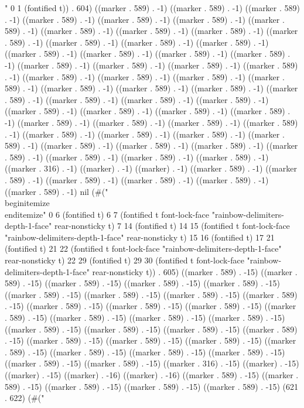 " 0 1 (fontified t)) . 604) ((marker . 589) . -1) ((marker . 589) . -1) ((marker . 589) . -1) ((marker . 589) . -1) ((marker . 589) . -1) ((marker . 589) . -1) ((marker . 589) . -1) ((marker . 589) . -1) ((marker . 589) . -1) ((marker . 589) . -1) ((marker . 589) . -1) ((marker . 589) . -1) ((marker . 589) . -1) ((marker . 589) . -1) ((marker . 589) . -1) ((marker . 589) . -1) ((marker . 589) . -1) ((marker . 589) . -1) ((marker . 589) . -1) ((marker . 589) . -1) ((marker . 589) . -1) ((marker . 589) . -1) ((marker . 589) . -1) ((marker . 589) . -1) ((marker . 589) . -1) ((marker . 589) . -1) ((marker . 589) . -1) ((marker . 589) . -1) ((marker . 589) . -1) ((marker . 589) . -1) ((marker . 589) . -1) ((marker . 589) . -1) ((marker . 589) . -1) ((marker . 589) . -1) ((marker . 589) . -1) ((marker . 589) . -1) ((marker . 589) . -1) ((marker . 589) . -1) ((marker . 589) . -1) ((marker . 589) . -1) ((marker . 589) . -1) ((marker . 589) . -1) ((marker . 589) . -1) ((marker . 589) . -1) ((marker . 589) . -1) ((marker . 589) . -1) ((marker . 589) . -1) ((marker . 589) . -1) ((marker . 589) . -1) ((marker . 589) . -1) ((marker . 589) . -1) ((marker . 589) . -1) ((marker . 316) . -1) ((marker) . -1) ((marker) . -1) ((marker . 589) . -1) ((marker . 589) . -1) ((marker . 589) . -1) ((marker . 589) . -1) ((marker . 589) . -1) ((marker . 589) . -1) nil (#("\\begin{itemize}
 \\end{itemize}" 0 6 (fontified t) 6 7 (fontified t font-lock-face "rainbow-delimiters-depth-1-face" rear-nonsticky t) 7 14 (fontified t) 14 15 (fontified t font-lock-face "rainbow-delimiters-depth-1-face" rear-nonsticky t) 15 16 (fontified t) 17 21 (fontified t) 21 22 (fontified t font-lock-face "rainbow-delimiters-depth-1-face" rear-nonsticky t) 22 29 (fontified t) 29 30 (fontified t font-lock-face "rainbow-delimiters-depth-1-face" rear-nonsticky t)) . 605) ((marker . 589) . -15) ((marker . 589) . -15) ((marker . 589) . -15) ((marker . 589) . -15) ((marker . 589) . -15) ((marker . 589) . -15) ((marker . 589) . -15) ((marker . 589) . -15) ((marker . 589) . -15) ((marker . 589) . -15) ((marker . 589) . -15) ((marker . 589) . -15) ((marker . 589) . -15) ((marker . 589) . -15) ((marker . 589) . -15) ((marker . 589) . -15) ((marker . 589) . -15) ((marker . 589) . -15) ((marker . 589) . -15) ((marker . 589) . -15) ((marker . 589) . -15) ((marker . 589) . -15) ((marker . 589) . -15) ((marker . 589) . -15) ((marker . 589) . -15) ((marker . 589) . -15) ((marker . 589) . -15) ((marker . 589) . -15) ((marker . 589) . -15) ((marker . 316) . -15) ((marker) . -15) ((marker) . -15) ((marker) . -16) ((marker) . -16) ((marker . 589) . -15) ((marker . 589) . -15) ((marker . 589) . -15) ((marker . 589) . -15) ((marker . 589) . -15) (621 . 622) (#("
